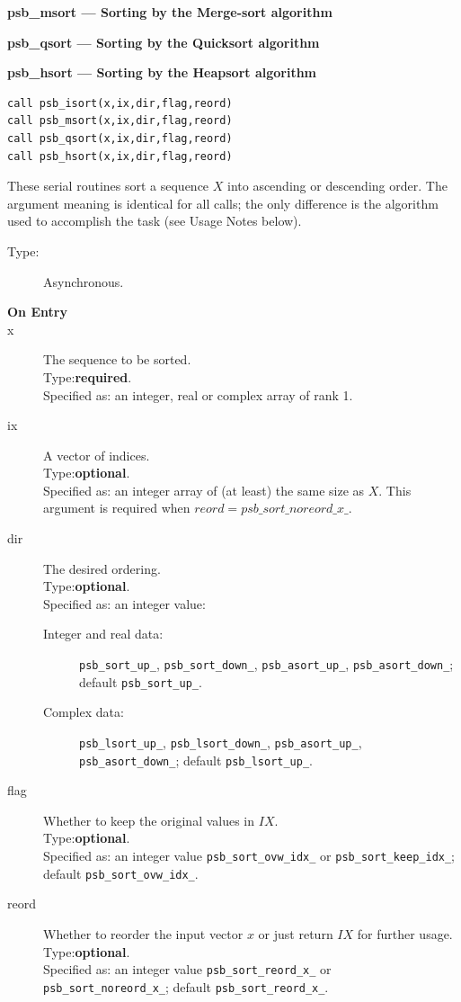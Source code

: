 {\par\noindent\large\bfseries psb\_msort --- Sorting by the Merge-sort
  algorithm}

{\par\noindent\large\bfseries psb\_qsort --- Sorting by the Quicksort
  algorithm}

{\par\noindent\large\bfseries psb\_hsort --- Sorting by the Heapsort  algorithm}
\begin{verbatim}
call psb_isort(x,ix,dir,flag,reord)
call psb_msort(x,ix,dir,flag,reord)
call psb_qsort(x,ix,dir,flag,reord)
call psb_hsort(x,ix,dir,flag,reord)
\end{verbatim}

These  serial routines sort a sequence $X$ into ascending or
descending  order. The argument meaning is identical for all
calls; the only difference is the algorithm used to accomplish the
task (see Usage Notes below). 
\begin{description}
\item[Type:] Asynchronous.
\item[\bf  On Entry ]
\item[x] The sequence to be sorted.\\
Type:{\bf required}.\\
Specified as: an integer, real or complex  array of rank 1.
\item[ix] A vector of indices.\\
Type:{\bf optional}.\\
Specified as: an integer array of (at least) the same size as
$X$. This argument is required when $reord=psb\_sort\_noreord\_x\_$.
\item[dir] The desired ordering.\\
Type:{\bf optional}.\\
Specified as: an integer value: \begin{description}
\item[Integer and real data:] \verb|psb_sort_up_|,
\verb|psb_sort_down_|, \verb|psb_asort_up_|, \verb|psb_asort_down_|;
default \verb|psb_sort_up_|. 
\item[Complex data:] \verb|psb_lsort_up_|,
\verb|psb_lsort_down_|, \verb|psb_asort_up_|, \verb|psb_asort_down_|;
default \verb|psb_lsort_up_|. 
\end{description}
\item[flag] Whether to keep the original values in $IX$.\\
Type:{\bf optional}.\\
Specified as: an integer value \verb|psb_sort_ovw_idx_| or
\verb|psb_sort_keep_idx_|; default \verb|psb_sort_ovw_idx_|.
\item[reord] Whether to reorder the input vector $x$ or just return
   $IX$  for further usage.\\
Type:{\bf optional}.\\
Specified as: an integer value \verb|psb_sort_reord_x_| or
\verb|psb_sort_noreord_x_|; default \verb|psb_sort_reord_x_|.

\end{description}

